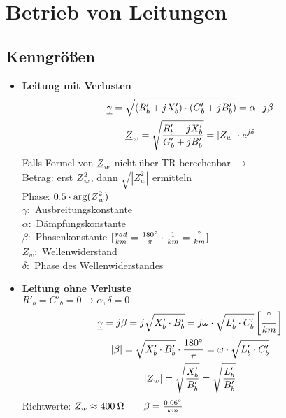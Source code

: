 \section{Betrieb von Leitungen}
\subsection{Kenngrößen}

\begin{itemize}
    \item[] \textbf{Leitung mit Verlusten}
    \begin{gather*}
        \underline{\gamma} = \sqrt{(R'_b +jX'_b)\cdot(G'_b+jB'_b)}= \alpha \cdot j \beta\\
        \underline{Z}_w = \sqrt{\dfrac{R'_b + jX'_b}{G'_b + jB'_b}}= |Z_w| \cdot e^{j\delta}
    \end{gather*}
    \indent Falls Formel von $\underline{Z}_w$ nicht über TR berechenbar $\rightarrow$\\
    Betrag: erst $\underline{Z}_w^2$, dann $\sqrt{|Z_w^2|}$ ermitteln \\
    Phase: $0.5 \cdot \arg(\underline{Z}_w^2)$ \\

    \indent $\gamma:$ Ausbreitungskonstante\\
    \indent $\alpha:$ Dämpfungskonstante\\
    \indent $\beta:$ Phasenkonstante $[\frac{rad}{km} = \frac{180\degree}{\pi} \cdot \frac{1}{km} = \frac{\degree}{km}]$\\
    \indent $Z_w:$ Wellenwiderstand\\
    \indent $\delta:$ Phase des Wellenwiderstandes\\

    \item[] \textbf{Leitung ohne Verluste}\\
            $R'_b = G'_b = 0\rightarrow \alpha, \delta = 0$
        \begin{gather*}
            \underline{\gamma} = j \beta = j \sqrt{X'_b \cdot B'_b} = j \omega \cdot \sqrt{L'_b \cdot C'_b}\left[\frac{\degree}{km} \right]\\
            |\beta| = \sqrt{X'_b \cdot B'_b} \cdot \frac{180\degree}{\pi} = \omega \cdot \sqrt{L'_b \cdot C'_b} \\
            |Z_w| = \sqrt{ \dfrac{X'_b}{B'_b} } = \sqrt{ \dfrac{L'_b}{B'_b} }
        \end{gather*}
    Richtwerte:
            $Z_w \approx 400\: \ohm \qquad \beta = \frac{0,06\degree}{km}$\\


\end{itemize}
